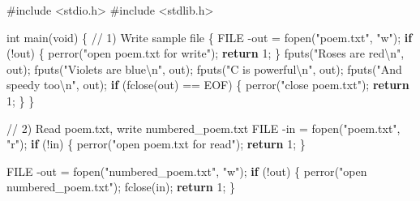 \documentclass[
  letterpaper,
  DIV=11,
  numbers=noendperiod]{scrreprt}
\newenvironment{Shaded}{\begin{snugshade}}{\end{snugshade}}
\newcommand{\CommentTok}[1]{\textcolor[rgb]{0.37,0.37,0.37}{#1}}
\newcommand{\ControlFlowTok}[1]{\textcolor[rgb]{0.00,0.23,0.31}{\textbf{#1}}}
\newcommand{\DataTypeTok}[1]{\textcolor[rgb]{0.68,0.00,0.00}{#1}}
\newcommand{\DecValTok}[1]{\textcolor[rgb]{0.68,0.00,0.00}{#1}}
\newcommand{\ImportTok}[1]{\textcolor[rgb]{0.00,0.46,0.62}{#1}}
\newcommand{\NormalTok}[1]{\textcolor[rgb]{0.00,0.23,0.31}{#1}}
\newcommand{\OperatorTok}[1]{\textcolor[rgb]{0.37,0.37,0.37}{#1}}
\newcommand{\PreprocessorTok}[1]{\textcolor[rgb]{0.68,0.00,0.00}{#1}}
\newcommand{\SpecialCharTok}[1]{\textcolor[rgb]{0.37,0.37,0.37}{#1}}
\newcommand{\StringTok}[1]{\textcolor[rgb]{0.13,0.47,0.30}{#1}}
\begin{document}
\begin{Shaded}
\begin{Highlighting}[]
\PreprocessorTok{\#include }\ImportTok{\textless{}stdio.h\textgreater{}}
\PreprocessorTok{\#include }\ImportTok{\textless{}stdlib.h\textgreater{}}

\DataTypeTok{int}\NormalTok{ main}\OperatorTok{(}\DataTypeTok{void}\OperatorTok{)} \OperatorTok{\{}
    \CommentTok{// 1) Write sample file}
    \OperatorTok{\{}
        \DataTypeTok{FILE} \OperatorTok{{-}}\NormalTok{out }\OperatorTok{=}\NormalTok{ fopen}\OperatorTok{(}\StringTok{"poem.txt"}\OperatorTok{,} \StringTok{"w"}\OperatorTok{);}
        \ControlFlowTok{if} \OperatorTok{(!}\NormalTok{out}\OperatorTok{)} \OperatorTok{\{}\NormalTok{ perror}\OperatorTok{(}\StringTok{"open poem.txt for write"}\OperatorTok{);} \ControlFlowTok{return} \DecValTok{1}\OperatorTok{;} \OperatorTok{\}}
\NormalTok{        fputs}\OperatorTok{(}\StringTok{"Roses are red}\SpecialCharTok{\textbackslash{}n}\StringTok{"}\OperatorTok{,}\NormalTok{ out}\OperatorTok{);}
\NormalTok{        fputs}\OperatorTok{(}\StringTok{"Violets are blue}\SpecialCharTok{\textbackslash{}n}\StringTok{"}\OperatorTok{,}\NormalTok{ out}\OperatorTok{);}
\NormalTok{        fputs}\OperatorTok{(}\StringTok{"C is powerful}\SpecialCharTok{\textbackslash{}n}\StringTok{"}\OperatorTok{,}\NormalTok{ out}\OperatorTok{);}
\NormalTok{        fputs}\OperatorTok{(}\StringTok{"And speedy too}\SpecialCharTok{\textbackslash{}n}\StringTok{"}\OperatorTok{,}\NormalTok{ out}\OperatorTok{);}
        \ControlFlowTok{if} \OperatorTok{(}\NormalTok{fclose}\OperatorTok{(}\NormalTok{out}\OperatorTok{)} \OperatorTok{==}\NormalTok{ EOF}\OperatorTok{)} \OperatorTok{\{}\NormalTok{ perror}\OperatorTok{(}\StringTok{"close poem.txt"}\OperatorTok{);} \ControlFlowTok{return} \DecValTok{1}\OperatorTok{;} \OperatorTok{\}}
    \OperatorTok{\}}

    \CommentTok{// 2) Read poem.txt, write numbered\_poem.txt}
    \DataTypeTok{FILE} \OperatorTok{{-}}\NormalTok{in  }\OperatorTok{=}\NormalTok{ fopen}\OperatorTok{(}\StringTok{"poem.txt"}\OperatorTok{,} \StringTok{"r"}\OperatorTok{);}
    \ControlFlowTok{if} \OperatorTok{(!}\NormalTok{in}\OperatorTok{)} \OperatorTok{\{}\NormalTok{ perror}\OperatorTok{(}\StringTok{"open poem.txt for read"}\OperatorTok{);} \ControlFlowTok{return} \DecValTok{1}\OperatorTok{;} \OperatorTok{\}}

    \DataTypeTok{FILE} \OperatorTok{{-}}\NormalTok{out }\OperatorTok{=}\NormalTok{ fopen}\OperatorTok{(}\StringTok{"numbered\_poem.txt"}\OperatorTok{,} \StringTok{"w"}\OperatorTok{);}
    \ControlFlowTok{if} \OperatorTok{(!}\NormalTok{out}\OperatorTok{)} \OperatorTok{\{}\NormalTok{ perror}\OperatorTok{(}\StringTok{"open numbered\_poem.txt"}\OperatorTok{);}\NormalTok{ fclose}\OperatorTok{(}\NormalTok{in}\OperatorTok{);} \ControlFlowTok{return} \DecValTok{1}\OperatorTok{;} \OperatorTok{\}}


\end{Highlighting}
\end{Shaded}
\end{document}
